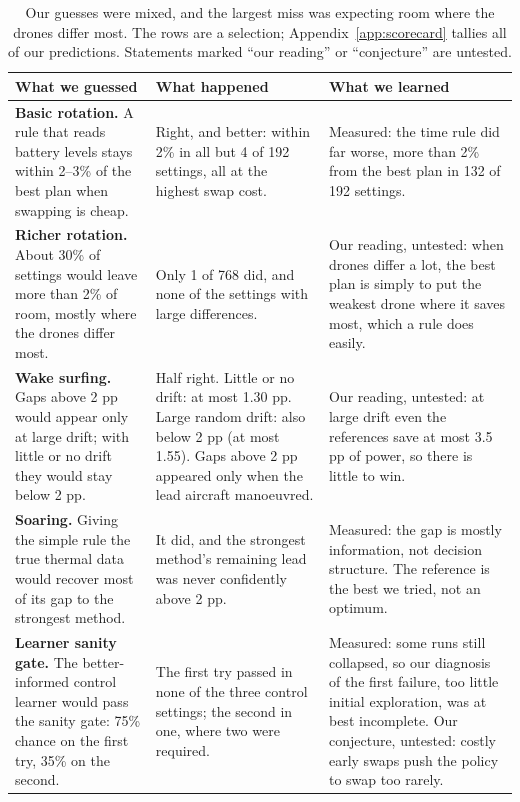 \documentclass[11pt]{article}
\begin{document}
\begin{table}[t]
\centering
\small
\caption{Our guesses were mixed, and the largest miss was expecting room where the drones differ most. The rows are a selection; Appendix~\ref{app:scorecard} tallies all of our predictions. Statements marked ``our reading'' or ``conjecture'' are untested.}
\label{tab:guess}
\begin{tabular}{@{}>{\raggedright\arraybackslash}p{}>{\raggedright\arraybackslash}p{}>{\raggedright\arraybackslash}p{}@{}}
\toprule
What we guessed & What happened & What we learned \\
\midrule
\textbf{Basic rotation.} A rule that reads battery levels stays within 2--3\% of the best plan when swapping is cheap.
& Right, and better: within 2\% in all but 4 of 192 settings, all at the highest swap cost.
& Measured: the time rule did far worse, more than 2\% from the best plan in 132 of 192 settings. \\
\addlinespace
\textbf{Richer rotation.} About 30\% of settings would leave more than 2\% of room, mostly where the drones differ most.
& Only 1 of 768 did, and none of the settings with large differences.
& Our reading, untested: when drones differ a lot, the best plan is simply to put the weakest drone where it saves most, which a rule does easily. \\
\addlinespace
\textbf{Wake surfing.} Gaps above 2 pp would appear only at large drift; with little or no drift they would stay below 2 pp.
& Half right. Little or no drift: at most 1.30 pp. Large random drift: also below 2 pp (at most 1.55). Gaps above 2 pp appeared only when the lead aircraft manoeuvred.
& Our reading, untested: at large drift even the references save at most 3.5 pp of power, so there is little to win. \\
\addlinespace
\textbf{Soaring.} Giving the simple rule the true thermal data would recover most of its gap to the strongest method.
& It did, and the strongest method's remaining lead was never confidently above 2 pp.
& Measured: the gap is mostly information, not decision structure. The reference is the best we tried, not an optimum. \\
\addlinespace
\textbf{Learner sanity gate.} The better-informed control learner would pass the sanity gate: 75\% chance on the first try, 35\% on the second.
& The first try passed in none of the three control settings; the second in one, where two were required.
& Measured: some runs still collapsed, so our diagnosis of the first failure, too little initial exploration, was at best incomplete. Our conjecture, untested: costly early swaps push the policy to swap too rarely. \\
\bottomrule
\end{tabular}
\end{table}
\end{document}

